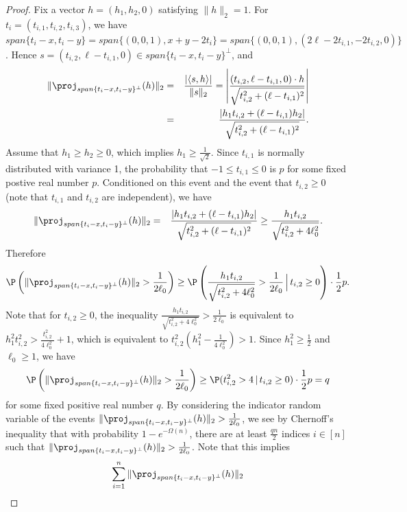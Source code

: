 \begin{proof}
Fix a vector $h=(h_{1},h_{2},0)$ satisfying $\|h\|_2=1$. For $t_{i}=(t_{i,1},t_{i,2},t_{i,3})$,
we have $span\{t_{i}-x,t_{i}-y\}=span\{(0,0,1),x+y-2t_{i}\}=span\{(0,0,1),(2\ell-2t_{i,1},-2t_{i,2},0)\}$.
Hence $s=(t_{i,2},\ell-t_{i,1},0)\in span\{t_{i}-x,t_{i}-y\}^{\perp}$, and
\begin{eqnarray*}
	\|\proj_{span\{t_{i}-x,t_{i}-y\}^{\perp}}(h)\|_2 
	& = & \frac{|\langle s,h\rangle |}{\|s\|_2}=\left|\frac{(t_{i,2},\ell-t_{i,1},0)\cdot h}{\sqrt{t_{i,2}^{2}+(\ell-t_{i,1})^{2}}}\right|\\
 & = & \frac{\left|h_{1}t_{i,2}+(\ell-t_{i,1})h_{2}\right|}{\sqrt{t_{i,2}^{2}+(\ell-t_{i,1})^{2}}}.
\end{eqnarray*}
Assume that $h_{1}\ge h_{2}\ge0$, which implies $h_{1}\ge\frac{1}{\sqrt{2}}$.
Since $t_{i,1}$ is normally distributed with variance 1, the probability
that $-1\le t_{i,1}\le0$ is $p$ for some fixed postive real number
$p$. Conditioned on this event and the event that $t_{i,2}\ge0$
(note that $t_{i,1}$ and $t_{i,2}$ are independent), we have 
\begin{eqnarray*}
	\|\proj_{span\{t_{i}-x,t_{i}-y\}^{\perp}}(h)\|_2
	& = & \frac{\left|h_{1}t_{i,2}+(\ell-t_{i,1})h_{2}\right|}{\sqrt{t_{i,2}^{2}+(\ell-t_{i,1})^{2}}}\ge\frac{h_{1}t_{i,2}}{\sqrt{t_{i,2}^{2}+4\ell_{0}^{2}}}.
\end{eqnarray*}
Therefore 
\[
	\P\left(\|\proj_{span\{t_{i}-x,t_{i}-y\}^{\perp}}(h)\|_2
	>\frac{1}{2\ell_{0}}\right)\ge\P\left(\frac{h_{1}t_{i,2}}{\sqrt{t_{i,2}^{2}+4\ell_{0}^{2}}}>\frac{1}{2\ell_{0}}\,\Big|\, t_{i,2}\ge0\right)\cdot\frac{1}{2}p.
\]
Note that for $t_{i,2}\ge0$, the inequality $\frac{h_{1}t_{i,2}}{\sqrt{t_{i,2}^{2}+4\ell_{0}^{2}}}>\frac{1}{2\ell_{0}}$
is equivalent to $h_{1}^{2}t_{i,2}^{2}>\frac{t_{i,2}^{2}}{4\ell_{0}^{2}}+1$,
which is equivalent to $t_{i,2}^{2}(h_{1}^{2}-\frac{1}{4\ell_{0}^{2}})>1$.
Since $h_{1}^{2}\ge\frac{1}{2}$ and $\ell_{0}\ge1$, we have 
\[
	\P\left(\|\proj_{span\{t_{i}-x,t_{i}-y\}^{\perp}}(h)\|_2>\frac{1}{2\ell_{0}}\right)
	\ge\P(t_{i,2}^{2}>4\,|\, t_{i,2}\ge0)\cdot\frac{1}{2}p=q
\]
for some fixed positive real number $q$. 
By considering the indicator random variable of the events 
$\|\proj_{span\{t_{i}-x,t_{i}-y\}^{\perp}}(h)\|_2>\frac{1}{2\ell_{0}}$, we see by Chernoff's inequality
that with probability $1-e^{-\Omega(n)}$, there are at least $\frac{qn}{2}$ indices 
$i \in [n]$ such that $\|\proj_{span\{t_{i}-x,t_{i}-y\}^{\perp}}(h)\|_2>\frac{1}{2\ell_{0}}$.
Note that this implies
\begin{eqnarray*}
	\sum_{i=1}^{n}\|\proj_{span\{t_{i}-x,t_{i}-y\}^{\perp}}(h)\|_2 

\end{eqnarray*}
\end{proof}
